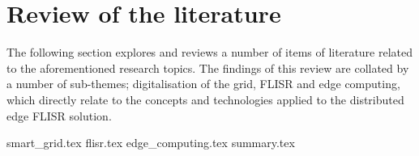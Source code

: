 \section{Review of the literature}
\label{sec:literature}

\noindent
The following section explores and reviews a number of items of literature related to the aforementioned research topics. The findings of this review are collated by a number of sub-themes;
digitalisation of the grid, FLISR and edge computing, which directly relate to the concepts and technologies applied to the distributed edge FLISR solution.

{smart_grid.tex}
{flisr.tex}
{edge_computing.tex}
{summary.tex}

